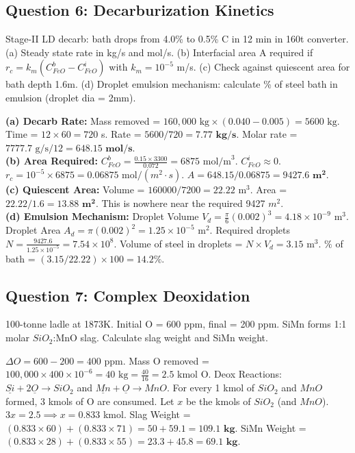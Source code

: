 \documentclass[11pt,a4paper]{article}
\begin{document}
\subsection{Question 6: Decarburization Kinetics}
\begin{questionbox}
Stage-II LD decarb: bath drops from 4.0\% to 0.5\% C in 12 min in 160t converter.
(a) Steady state rate in kg/s and mol/s.
(b) Interfacial area A required if $r_c = k_m(C_{FeO}^b - C_{FeO}^i)$ with $k_m = 10^{-5}$ m/s.
(c) Check against quiescent area for bath depth 1.6m.
(d) Droplet emulsion mechanism: calculate \% of steel bath in emulsion (droplet dia = 2mm).
\end{questionbox}
\begin{solutionbox}
\textbf{(a) Decarb Rate:}
Mass removed = $160,000 \text{ kg} \times (0.040 - 0.005) = 5600 \text{ kg}$.
Time = $12 \times 60 = 720$ s. Rate = $5600 / 720 = \mathbf{7.77 \text{ kg/s}}$.
Molar rate = $7777.7 \text{ g/s} / 12 = \mathbf{648.15 \text{ mol/s}}$. \\
\textbf{(b) Area Required:}
$C_{FeO}^b = \frac{0.15 \times 3300}{0.072} = 6875 \text{ mol/m}^3$. $C_{FeO}^i \approx 0$.
$r_c = 10^{-5} \times 6875 = 0.06875 \text{ mol}/(m^2\cdot s)$.
$A = 648.15 / 0.06875 = \mathbf{9427.6 \text{ m}^2}$. \\
\textbf{(c) Quiescent Area:}
Volume = $160000 / 7200 = 22.22 \text{ m}^3$.
Area = $22.22 / 1.6 = \mathbf{13.88 \text{ m}^2}$. This is nowhere near the required 9427 $m^2$. \\
\textbf{(d) Emulsion Mechanism:}
Droplet Volume $V_d = \frac{\pi}{6}(0.002)^3 = 4.18 \times 10^{-9} \text{ m}^3$.
Droplet Area $A_d = \pi(0.002)^2 = 1.25 \times 10^{-5} \text{ m}^2$.
Required droplets $N = \frac{9427.6}{1.25 \times 10^{-5}} = 7.54 \times 10^8$.
Volume of steel in droplets = $N \times V_d = 3.15 \text{ m}^3$.
$\%$ of bath = $(3.15 / 22.22) \times 100 = \mathbf{14.2\%}$.
\end{solutionbox}

\subsection{Question 7: Complex Deoxidation}
\begin{questionbox}
100-tonne ladle at 1873K. Initial O = 600 ppm, final = 200 ppm. SiMn forms 1:1 molar $SiO_2$:MnO slag. Calculate slag weight and SiMn weight.
\end{questionbox}
\begin{solutionbox}
$\Delta O = 600 - 200 = 400$ ppm.
Mass O removed = $100,000 \times 400 \times 10^{-6} = 40 \text{ kg} = \frac{40}{16} = 2.5$ kmol O.
Deox Reactions: $\underline{Si} + 2\underline{O} \to SiO_2$ and $\underline{Mn} + \underline{O} \to MnO$.
For every 1 kmol of $SiO_2$ and $MnO$ formed, 3 kmols of O are consumed.
Let $x$ be the kmols of $SiO_2$ (and $MnO$). $3x = 2.5 \implies x = 0.833$ kmol.
Slag Weight = $(0.833 \times 60) + (0.833 \times 71) = 50 + 59.1 = \mathbf{109.1 \text{ kg}}$.
SiMn Weight = $(0.833 \times 28) + (0.833 \times 55) = 23.3 + 45.8 = \mathbf{69.1 \text{ kg}}$.
\end{solutionbox}
\end{document}
